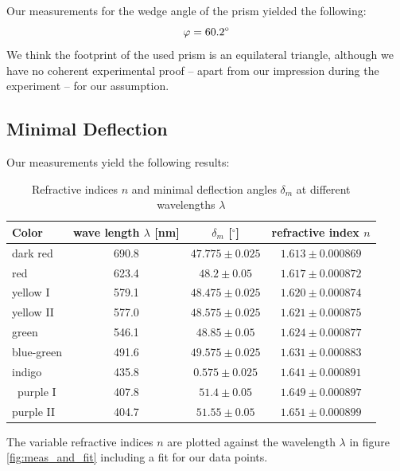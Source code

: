 \documentclass{scrreprt}
\renewcommand{\phi}{\varphi}
\begin{document}
Our measurements for the wedge angle of the prism yielded the following:
\begin{equation}
	\phi = \ang{60.2}
\notag
\end{equation}
We think the footprint of the used prism is an equilateral triangle, although we have no coherent experimental proof -- apart from our impression during the experiment --  for our assumption.

\subsection{Minimal Deflection}

Our measurements yield the following results:

\begin{table}[H]
\centering
\begin{tabular}{|l|c|c|c|}
\hline
Color & wave length $\lambda$ [nm] & $\delta_m$ [$^\circ$] & refractive index $n$\\
\hline\hline
dark red & 690.8 & $47.775 \pm 0.025$  & $1.613 \pm 0.000869$\\
red & 623.4 & $48.2 \pm 0.05$ & $1.617 \pm 0.000872$\\
yellow I & 579.1 & $48.475 \pm 0.025$ & $1.620 \pm 0.000874$\\
yellow II & 577.0 & $48.575 \pm 0.025$ & $1.621 \pm 0.000875$\\
green & 546.1 & $48.85 \pm 0.05$ & $1.624 \pm 0.000877$\\
blue-green & 491.6 & $49.575 \pm 0.025$ & $1.631 \pm 0.000883$\\
indigo & 435.8 & $0.575 \pm 0.025$ & $1.641 \pm 0.000891$\\\
purple I & 407.8 & $51.4 \pm 0.05$ & $1.649 \pm 0.000897$\\
purple II & 404.7 & $51.55 \pm 0.05$ & $1.651 \pm 0.000899$\\\hline
\end{tabular}
\caption{Refractive indices $n$ and minimal deflection angles $\delta_m$ at different wavelengths $\lambda$}
\label{tab:n_results}
\end{table}

The variable refractive indices $n$ are plotted against the wavelength $\lambda$ in figure \ref{fig:meas_and_fit} including a fit for our data points.
\end{document}
